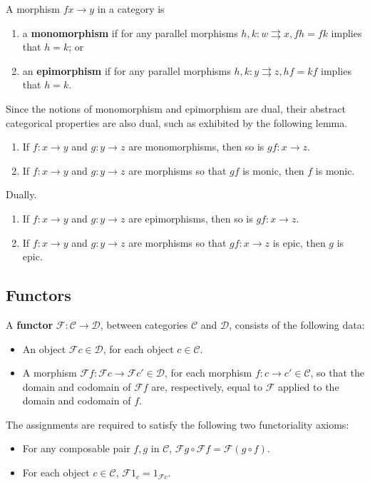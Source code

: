 \begin{definition}
  A morphism $ f x \to y $ in a category is
  \begin{enumerate}
    \item a \textbf{monomorphism} if for any parallel morphisms $ h,k: w \rightrightarrows x, fh=fk $ implies that $ h = k $; or
    \item an \textbf{epimorphism} if for any parallel morphisms $ h,k:y\rightrightarrows z, hf = kf $ implies that $ h = k $.
  \end{enumerate}
\end{definition}

Since the notions of monomorphism and epimorphism are dual, their abstract categorical properties are also dual, such as exhibited by the following lemma.
\begin{lemma}
   \begin{enumerate}
    \item If $ f : x \to y $ and $ g: y \to z $ are monomorphisms, then so is $ gf: x\to z $.
    \item If $ f:x \to y $ and $ g: y\to z $ are morphisms so that $ gf $ is monic, then $ f $ is monic.
   \end{enumerate}
   Dually.
   \begin{enumerate}
    \item If $ f:x \to y $ and $ g: y\to z $ are epimorphisms, then so is $ gf: x\to z $.
    \item If $ f: x\to y $ and $ g: y\to z $ are morphisms so that $ gf: x\to z $ is epic, then $ g $ is epic.
   \end{enumerate}
\end{lemma}

\subsection{Functors} %
\label{sub:functors}
\begin{definition}
  A \textbf{functor} $ \mathcal{F}:\mathcal{C}\to\mathcal{D} $, between categories $ \mathcal{C} $ and $ \mathcal{D} $, consists of the following data:
  \begin{itemize}
    \item An object $ \mathcal{F}c \in\mathcal{D} $, for each object $ c \in \mathcal{C} $.
    \item A morphism $ \mathcal{F}f: \mathcal{F}c\to\mathcal{F}c' \in \mathcal{D} $, for each morphism $ f: c \to c' \in \mathcal{C} $, so that the domain and codomain of $ \mathcal{F}f $ are, respectively, equal to $ \mathcal{F} $ applied to the domain and codomain of $ f $.
  \end{itemize}
  The assignments are required to satisfy the following two functoriality axioms:
  \begin{itemize}
    \item For any composable pair $ f,g $ in $ \mathcal{C} $, $ \mathcal{F}g\circ\mathcal{F}f = \mathcal{F}(g\circ f) $.
    \item For each object $ c \in \mathcal{C} $, $ \mathcal{F}1_{c} = 1_{\mathcal{F}c} $.
  \end{itemize}
\end{definition}

